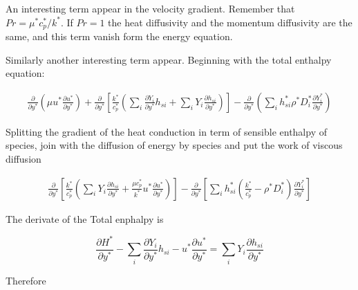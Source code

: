 An interesting term  appear in the velocity gradient.  
Remember that \\$Pr=\mu^*c_p^*/k^*$. If $Pr=1$ 
the heat diffusivity and the momentum diffusivity are 
the same, and this term vanish form the energy equation. 

Similarly another interesting term appear. 
Beginning with the total enthalpy equation: 

\begin{equation*} 
\begin{split} 
\frac{\partial}{\partial y^*}
\left(
    \mu
    u^*
    \frac{\partial u^*}{\partial y^*}
\right)
+
\frac{\partial}{\partial y^*}
\left[
    \frac{k^*}{c_p^*}
    \left(
        \sum_i
        \frac{\partial Y_i}{\partial y^*}
        h_{si}
        +
        \sum_i
        Y_i
        \frac{\partial h_{si} }{\partial y^*}
    \right)
\right]
-
\frac{\partial}{\partial y^*}
\left(
        \sum_i
        h_{si}^*
        \rho^* 
        D_i^*
        \frac{\partial Y_i^*}{\partial y^*}
\right)
\end{split} 
\end{equation*} 

Splitting  the gradient of the heat conduction in term of 
sensible  enthalpy of species, join with the  diffusion of energy by species   
and put the work of viscous diffusion 

\begin{equation*} 
\begin{split} 
\frac{\partial}{\partial y^*}
\left[
    \frac{k^*}{c_p^*} 
    \left(
    \sum_i
    Y_i
    \frac{\partial h_{si} }{\partial y^*}
    +
    \frac{\mu c_p^*}{k^*}   
    u^*
    \frac{\partial u^*}{\partial y^*}
    \right)
\right]
-
\frac{\partial}{\partial y^*}
    \left[
        \sum_i
        h_{si}^*
        \left(
            \frac{k^*}{c_p^*} 
            -
            \rho^* 
            D_i^*
        \right)
        \frac{\partial Y^*_i}{\partial y^*}
    \right]
\end{split} 
\end{equation*} 

The derivate of the Total enphalpy is 

\begin{equation*} 
\frac{\partial H^*}{\partial y^*}
-
\sum_i
\frac{\partial Y_i}{\partial y^*}
h_{si}
-
u^*
\frac{\partial u^*}{\partial y^*}
=
\sum_i
Y_i
\frac{\partial h_{si} }{\partial y^*}
\end{equation*} 

Therefore


